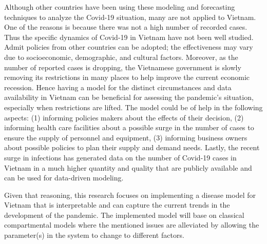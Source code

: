 Although other countries have been using these modeling and forecasting techniques to analyze the Covid-19 situation, many are not applied to Vietnam.
One of the reasons is because there was not a high number of recorded cases.
Thus the specific dynamics of Covid-19 in Vietnam have not been well studied.
Admit policies from other countries can be adopted; the effectiveness may vary due to socioeconomic, demographic, and cultural factors.
Moreover, as the number of reported cases is dropping, the Vietnamese government is slowly removing its restrictions in many places to help improve the current economic recession.
Hence having a model for the distinct circumstances and data availability in Vietnam can be beneficial for assessing the pandemic's situation, especially when restrictions are lifted.
The model could be of help in the following aspects: (1) informing policies makers about the effects of their decision, (2) informing health care facilities about a possible surge in the number of cases to ensure the supply of personnel and equipment, (3) informing business owners about possible policies to plan their supply and demand needs.
Lastly, the recent surge in infections has generated data on the number of Covid-19 cases in Vietnam in a much higher quantity and quality that are publicly available and can be used for data-driven modeling.

Given that reasoning, this research focuses on implementing a disease model for Vietnam that is interpretable and can capture the current trends in the development of the pandemic.
The implemented model will base on classical compartmental models where the mentioned issues are alleviated by allowing the parameter(s) in the system to change to different factors.